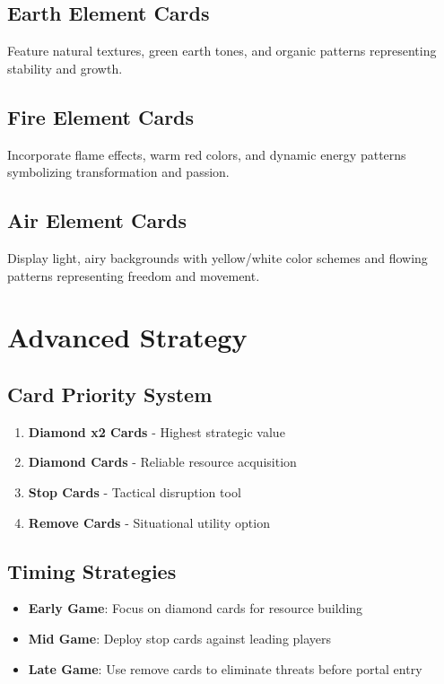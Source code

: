 \documentclass[12pt,a4paper]{article}
\begin{document}
\subsection{\textcolor{earthgreen}{Earth Element Cards}}
Feature natural textures, green earth tones, and organic patterns representing stability and growth.

\subsection{\textcolor{firered}{Fire Element Cards}}
Incorporate flame effects, warm red colors, and dynamic energy patterns symbolizing transformation and passion.

\subsection{\textcolor{airyellow}{Air Element Cards}}
Display light, airy backgrounds with yellow/white color schemes and flowing patterns representing freedom and movement.

\section{Advanced Strategy}

\subsection{Card Priority System}
\begin{enumerate}
    \item \textbf{Diamond x2 Cards} - Highest strategic value
    \item \textbf{Diamond Cards} - Reliable resource acquisition  
    \item \textbf{Stop Cards} - Tactical disruption tool
    \item \textbf{Remove Cards} - Situational utility option
\end{enumerate}

\subsection{Timing Strategies}
\begin{itemize}
    \item \textbf{Early Game}: Focus on diamond cards for resource building
    \item \textbf{Mid Game}: Deploy stop cards against leading players
    \item \textbf{Late Game}: Use remove cards to eliminate threats before portal entry
\end{itemize}
\end{document}
